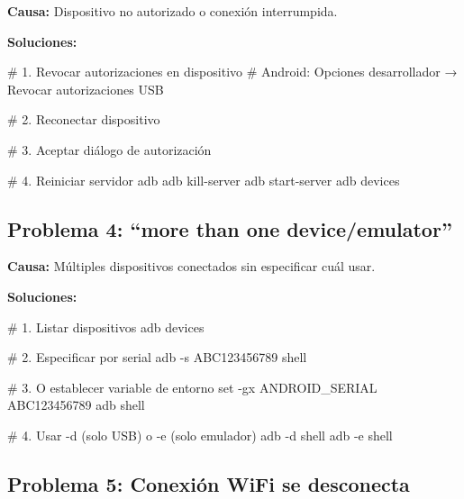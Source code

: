 \documentclass[
  doc,
  floatsintext,
  longtable,
  a4paper,
  nolmodern,
  notxfonts,
  notimes,
  12pt,
  colorlinks=true,linkcolor=blue,citecolor=blue,urlcolor=blue]{apa7}
\newenvironment{Shaded}{\begin{snugshade}}{\end{snugshade}}
\newcommand{\AttributeTok}[1]{\textcolor[rgb]{0.40,0.45,0.13}{#1}}
\newcommand{\BuiltInTok}[1]{\textcolor[rgb]{0.00,0.23,0.31}{#1}}
\newcommand{\CommentTok}[1]{\textcolor[rgb]{0.37,0.37,0.37}{#1}}
\newcommand{\ExtensionTok}[1]{\textcolor[rgb]{0.00,0.23,0.31}{#1}}
\newcommand{\NormalTok}[1]{\textcolor[rgb]{0.00,0.23,0.31}{#1}}
\begin{document}
\textbf{Causa:} Dispositivo no autorizado o conexión interrumpida.

\textbf{Soluciones:}

\begin{Shaded}
\begin{Highlighting}[]
\CommentTok{\# 1. Revocar autorizaciones en dispositivo}
\CommentTok{\# Android: Opciones desarrollador → Revocar autorizaciones USB}

\CommentTok{\# 2. Reconectar dispositivo}

\CommentTok{\# 3. Aceptar diálogo de autorización}

\CommentTok{\# 4. Reiniciar servidor adb}
\ExtensionTok{adb}\NormalTok{ kill{-}server}
\ExtensionTok{adb}\NormalTok{ start{-}server}
\ExtensionTok{adb}\NormalTok{ devices}
\end{Highlighting}
\end{Shaded}

\subsection{Problema 4: ``more than one
device/emulator''}\label{problema-4-more-than-one-deviceemulator}

\textbf{Causa:} Múltiples dispositivos conectados sin especificar cuál
usar.

\textbf{Soluciones:}

\begin{Shaded}
\begin{Highlighting}[]
\CommentTok{\# 1. Listar dispositivos}
\ExtensionTok{adb}\NormalTok{ devices}

\CommentTok{\# 2. Especificar por serial}
\ExtensionTok{adb} \AttributeTok{{-}s}\NormalTok{ ABC123456789 shell}

\CommentTok{\# 3. O establecer variable de entorno}
\BuiltInTok{set} \AttributeTok{{-}gx}\NormalTok{ ANDROID\_SERIAL ABC123456789}
\ExtensionTok{adb}\NormalTok{ shell}

\CommentTok{\# 4. Usar {-}d (solo USB) o {-}e (solo emulador)}
\ExtensionTok{adb} \AttributeTok{{-}d}\NormalTok{ shell}
\ExtensionTok{adb} \AttributeTok{{-}e}\NormalTok{ shell}
\end{Highlighting}
\end{Shaded}

\subsection{Problema 5: Conexión WiFi se
desconecta}\label{problema-5-conexiuxf3n-wifi-se-desconecta}
\end{document}
